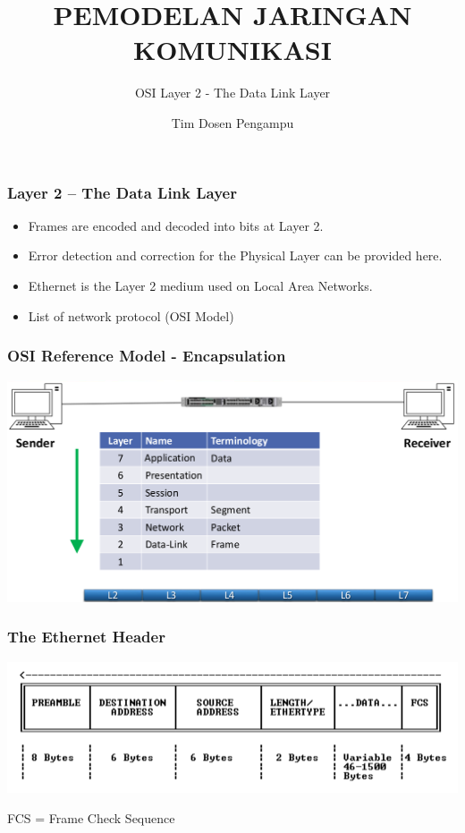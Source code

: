 \documentclass[pdflatex,compress]{beamer}
\title{PEMODELAN JARINGAN KOMUNIKASI}
\subtitle{OSI Layer 2 - The Data Link Layer}
\author{Tim Dosen Pengampu}
\begin{document}
\maketitle

\begin{frame}
	\frametitle{Layer 2 – The Data Link Layer}
	\begin{itemize}
		\item Frames are encoded and decoded into bits at Layer 2.
		\item Error detection and correction for the Physical Layer can be provided here.
		\item Ethernet is the Layer 2 medium used on Local Area Networks.
		\item List of network protocol (OSI Model) \href{https://en.wikipedia.org/wiki/List_of_network_protocols_(OSI_model)}{} 
	\end{itemize}
\end{frame}

\begin{frame}
	\frametitle{OSI Reference Model - Encapsulation}
	\begin{center}
		\includegraphics[width=\linewidth]{img/img01}
	\end{center}
\end{frame}

\begin{frame}
	\frametitle{The Ethernet Header}
	\begin{center}
		\includegraphics[width=\linewidth]{img/img02}
	\end{center}
	FCS = Frame Check Sequence
\end{frame}
\end{document}
